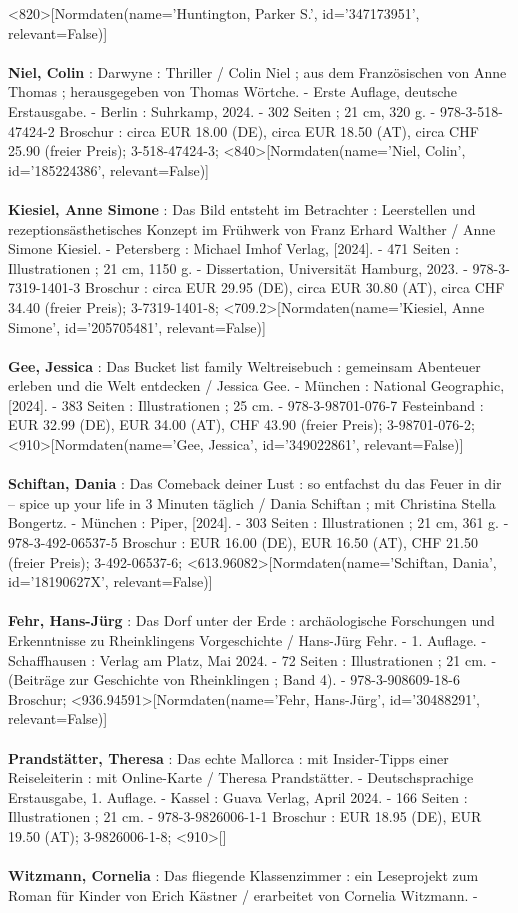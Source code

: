 \documentclass{article}
\begin{document}
\begin{multicols}{3}
<820>[Normdaten(name='Huntington, Parker S.', id='347173951', relevant=False)]\\\\\textbf{Niel, Colin} : Darwyne : Thriller / Colin Niel ; aus dem Französischen von Anne Thomas ; herausgegeben von Thomas Wörtche. - Erste Auflage, deutsche Erstausgabe. - Berlin : Suhrkamp, 2024. - 302 Seiten ; 21 cm, 320 g. - 978-3-518-47424-2 Broschur : circa EUR 18.00 (DE), circa EUR 18.50 (AT), circa CHF 25.90 (freier Preis); 3-518-47424-3; <840>[Normdaten(name='Niel, Colin', id='185224386', relevant=False)]\\\\\textbf{Kiesiel, Anne Simone} : Das Bild entsteht im Betrachter : Leerstellen und rezeptionsästhetisches Konzept im Frühwerk von Franz Erhard Walther / Anne Simone Kiesiel. - Petersberg : Michael Imhof Verlag, [2024]. - 471 Seiten : Illustrationen ; 21 cm, 1150 g. - Dissertation, Universität Hamburg, 2023. - 978-3-7319-1401-3 Broschur : circa EUR 29.95 (DE), circa EUR 30.80 (AT), circa CHF 34.40 (freier Preis); 3-7319-1401-8; <709.2>[Normdaten(name='Kiesiel, Anne Simone', id='205705481', relevant=False)]\\\\\textbf{Gee, Jessica} : Das Bucket list family Weltreisebuch : gemeinsam Abenteuer erleben und die Welt entdecken / Jessica Gee. - München : National Geographic, [2024]. - 383 Seiten : Illustrationen ; 25 cm. - 978-3-98701-076-7 Festeinband : EUR 32.99 (DE), EUR 34.00 (AT), CHF 43.90 (freier Preis); 3-98701-076-2; <910>[Normdaten(name='Gee, Jessica', id='349022861', relevant=False)]\\\\\textbf{Schiftan, Dania} : Das Comeback deiner Lust : so entfachst du das Feuer in dir – spice up your life in 3 Minuten täglich / Dania Schiftan ; mit Christina Stella Bongertz. - München : Piper, [2024]. - 303 Seiten : Illustrationen ; 21 cm, 361 g. - 978-3-492-06537-5 Broschur : EUR 16.00 (DE), EUR 16.50 (AT), CHF 21.50 (freier Preis); 3-492-06537-6; <613.96082>[Normdaten(name='Schiftan, Dania', id='18190627X', relevant=False)]\\\\\textbf{Fehr, Hans-Jürg} : Das Dorf unter der Erde : archäologische Forschungen und Erkenntnisse zu Rheinklingens Vorgeschichte / Hans-Jürg Fehr. - 1. Auflage. - Schaffhausen : Verlag am Platz, Mai 2024. - 72 Seiten : Illustrationen ; 21 cm. - (Beiträge zur Geschichte von Rheinklingen ; Band 4). - 978-3-908609-18-6 Broschur; <936.94591>[Normdaten(name='Fehr, Hans-Jürg', id='30488291', relevant=False)]\\\\\textbf{Prandstätter, Theresa} : Das echte Mallorca : mit Insider-Tipps einer Reiseleiterin : mit Online-Karte / Theresa Prandstätter. - Deutschsprachige Erstausgabe, 1. Auflage. - Kassel : Guava Verlag, April 2024. - 166 Seiten : Illustrationen ; 21 cm. - 978-3-9826006-1-1 Broschur : EUR 18.95 (DE), EUR 19.50 (AT); 3-9826006-1-8; <910>[]\\\\\textbf{Witzmann, Cornelia} : Das fliegende Klassenzimmer : ein Leseprojekt zum Roman für Kinder von Erich Kästner / erarbeitet von Cornelia Witzmann. - 
\end{multicols}
\end{document}
